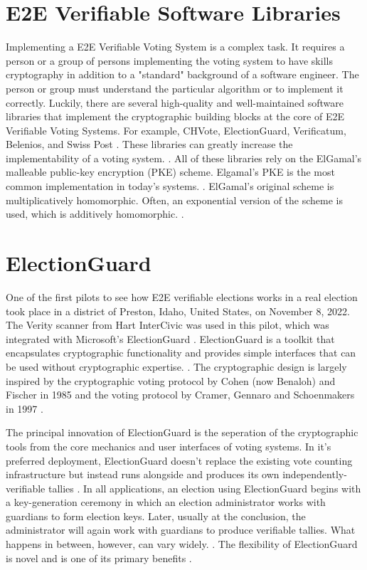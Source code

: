\section{E2E Verifiable Software Libraries}
Implementing a E2E Verifiable Voting System is a complex task. It requires a person or a group of persons implementing the voting system to have skills cryptography in addition to a "standard" background of a software engineer. The person or group must understand the particular algorithm or to implement it correctly. Luckily, there are several high-quality and well-maintained software libraries that implement the cryptographic building blocks at the core of E2E Verifiable Voting Systems. For example, CHVote, ElectionGuard, Verificatum, Belenios, and Swiss Post \cite[26]{onlinee-2e-study}. These libraries can greatly increase the implementability of a voting system. \cite[11]{onlinee-2e-study}. All of these libraries rely on the ElGamal's malleable public-key encryption (PKE) scheme. Elgamal's PKE is the most common implementation in today's systems. \cite[40]{onlinee-2e-study}. ElGamal's original scheme is multiplicatively homomorphic. Often, an exponential version of the scheme is used, which is additively homomorphic. \cite[40]{onlinee-2e-study}.

\section{ElectionGuard}
One of the first pilots to see how E2E verifiable elections works in a real election took place in a district of Preston, Idaho, United States, on November 8, 2022. The Verity scanner from Hart InterCivic was used in this pilot, which was integrated with Microsoft's ElectionGuard \cite{EAC}. ElectionGuard is a toolkit that encapsulates cryptographic functionality and provides simple interfaces that can be used without cryptographic expertise. \cite[1-2]{eg-paper}. The cryptographic design is largely inspired by the cryptographic voting protocol by Cohen (now Benaloh) and Fischer in 1985 and the voting protocol by Cramer, Gennaro and Schoenmakers in 1997 \cite[5]{eg-paper}. 

The principal innovation of ElectionGuard is the seperation of the cryptographic tools from the core mechanics and user interfaces of voting systems. In it's preferred deployment, ElectionGuard doesn't replace the existing vote counting infrastructure but instead runs alongside and produces its own independently-verifiable tallies \cite[1-2]{eg-paper}. In all applications, an election using ElectionGuard begins with a key-generation ceremony in which an election administrator works with guardians to form election keys. Later, usually at the conclusion, the administrator will again work with guardians to produce verifiable tallies. What happens in between, however, can vary widely. \cite[20]{eg-paper}. The flexibility of ElectionGuard is novel and is one of its primary benefits \cite[22]{eg-paper}.

